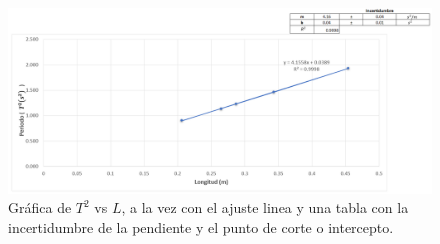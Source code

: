 \documentclass[10pt,a4paper]{article}
\begin{document}
\begin{figure}[H]
	\centering
	\includegraphics[scale=0.4]{imagenes-proyecto/grafico_t2_por_l.png}
	\captionsetup{justification=centering}
	\caption{Gráfica de $T^{2}$ vs $L$, a la vez con el ajuste linea y una tabla con la incertidumbre de la pendiente y el punto de corte o intercepto.}
	\label{Grafica T^2 VS L}
\end{figure}
\end{document}
